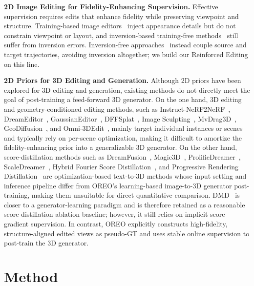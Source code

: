 \documentclass[runningheads]{llncs}
\begin{document}
\noindent\textbf{2D Image Editing for Fidelity-Enhancing Supervision.}
Effective supervision requires edits that enhance fidelity while preserving viewpoint and structure.
Training-based image editors~\cite{brooks2023instructpix2pix,zhang2023magicbrush,sheynin2023emu,zhao2024ultraedit} inject appearance details but do not constrain viewpoint or layout, and inversion-based training-free methods~\cite{hertz2022prompt,mokady2023null} still suffer from inversion errors.
Inversion-free approaches~\cite{couairon2024flowedit,zhang2024rfinversion} instead couple source and target trajectories, avoiding inversion altogether; we build our Reinforced Editing on this line.

\noindent\textbf{2D Priors for 3D Editing and Generation.}
Although 2D priors have been explored for 3D editing and generation, existing methods do not directly meet the goal of post-training a feed-forward 3D generator.
On the one hand, 3D editing and geometry-conditioned editing methods, such as Instruct-NeRF2NeRF~\cite{haque2023instruct}, DreamEditor~\cite{zhuang2023dreameditor}, GaussianEditor~\cite{wang2024gaussianeditor}, DFFSplat~\cite{koh2026diffusion}, Image Sculpting~\cite{yenphraphai2024image}, MvDrag3D~\cite{chen2024mvdrag3d}, GeoDiffusion~\cite{chen2024geodiffusion}, and Omni-3DEdit~\cite{chen2026omni}, mainly target individual instances or scenes and typically rely on per-scene optimization, making it difficult to amortize the fidelity-enhancing prior into a generalizable 3D generator.
On the other hand, score-distillation methods such as DreamFusion~\cite{poole2022dreamfusion}, Magic3D~\cite{lin2023magic3d}, ProlificDreamer~\cite{wang2024prolificdreamer}, ScaleDreamer~\cite{ma2024scaledreamer}, Hybrid Fourier Score Distillation~\cite{yang2025hybrid}, and Progressive Rendering Distillation~\cite{ma2025progressive} are optimization-based text-to-3D methods whose input setting and inference pipeline differ from OREO's learning-based image-to-3D generator post-training, making them unsuitable for direct quantitative comparison.
DMD~\cite{yin2024onestep} is closer to a generator-learning paradigm and is therefore retained as a reasonable score-distillation ablation baseline; however, it still relies on implicit score-gradient supervision.
In contrast, OREO explicitly constructs high-fidelity, structure-aligned edited views as pseudo-GT and uses stable online supervision to post-train the 3D generator.

\section{Method}
\label{sec:method}
\end{document}
